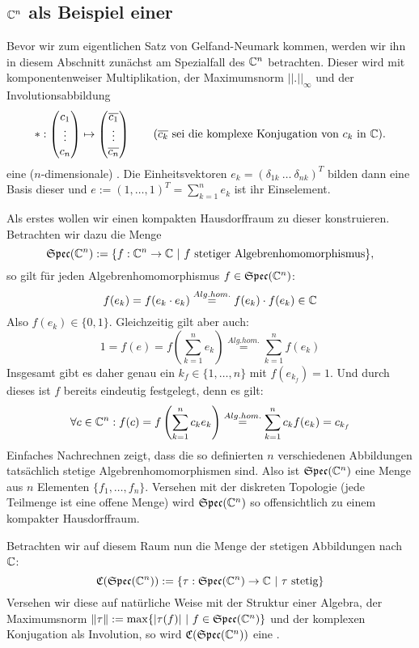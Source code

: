 \subsection{$\mathbb{C}^n$ als Beispiel einer \CAlg}\label{sec:BeispielCn}

Bevor wir zum eigentlichen Satz von Gelfand-Neumark kommen, werden wir ihn in diesem Abschnitt zunächst am Spezialfall des $\mathbb{C}^n$ betrachten. Dieser wird mit komponentenweiser Multiplikation, der Maximumsnorm $||.||_\infty$ und der Involutionsabbildung
\[*: 
\left(\begin{matrix}
 c_1 \\ \vdots \\ c_n 
\end{matrix}\right)
\mapsto 
\left(\begin{matrix}
\overline{c_1} \\ \vdots \\ \overline{c_n}
\end{matrix}\right) \qquad (\overline{c_k} \text{ sei die komplexe Konjugation von } c_k  \text{ in } \mathbb{C}).\]
eine ($n$-dimensionale) \CAlg{}. Die Einheitsvektoren $e_k = \left( \delta_{1k} \  \dots \ \delta_{nk} \right)^T$ bilden dann eine Basis dieser \CAlg{} und $e := (1,\dots,1)^T = \sum_{k=1}^ne_k$ ist ihr Einselement.

Als erstes wollen wir einen kompakten Hausdorffraum zu dieser \CAlg{} konstruieren. Betrachten wir dazu die Menge
	\[\mathfrak{Spec}(\mathbb{C}^n) := \{f: \mathbb{C}^n \to \mathbb{C} ~|~ f \text{ stetiger Algebrenhomomorphismus}\},\]
so gilt für jeden Algebrenhomomorphismus $f \in \mathfrak{Spec}(\mathbb{C}^n)$:
	\[f(e_k) = f(e_k \cdot e_k) \overset{Alg.hom.}{=} f(e_k) \cdot f(e_k) \in \mathbb{C}\]
Also $f(e_k) \in \{0, 1\}$. Gleichzeitig gilt aber auch:
	\[1 = f(e) = f\left(\sum_{k=1}^n e_k\right) \overset{Alg.hom.}{=} \sum_{k=1}^n f(e_k)\]
Insgesamt gibt es daher genau ein $k_f \in \{1, \dots, n\}$ mit $f(e_{k_f}) = 1$. Und durch dieses ist $f$ bereits eindeutig festgelegt, denn es gilt:
	\[\forall c \in \mathbb{C}^n: f(c) = f\left(\sum_{k=1}^n c_k e_k\right) \overset{Alg.hom.}{=} \sum_{k=1}^n c_k f(e_k) = c_{k_f} \]
Einfaches Nachrechnen zeigt, dass die so definierten $n$ verschiedenen Abbildungen tatsächlich stetige Algebrenhomomorphismen sind. Also ist $\mathfrak{Spec}(\mathbb{C}^n)$ eine Menge aus $n$ Elementen $\{f_1, \dots, f_n\}$. Versehen mit der diskreten Topologie (jede Teilmenge ist eine offene Menge) wird $\mathfrak{Spec}(\mathbb{C}^n)$ so offensichtlich zu einem kompakter Hausdorffraum.

Betrachten wir auf diesem Raum nun die Menge der stetigen Abbildungen nach $\mathbb{C}$:
	\[\mathfrak{C}(\mathfrak{Spec}(\mathbb{C}^n)) := \{\tau: \mathfrak{Spec}(\mathbb{C}^n) \to \mathbb{C} ~|~ \tau \text{ stetig}\}\]
Versehen wir diese auf natürliche Weise mit der Struktur einer Algebra, der Maximumsnorm $\left\lVert\tau\right\rVert := \max \{|\tau(f)| ~|~ f \in \mathfrak{Spec}(\mathbb{C}^n)\}$ und der komplexen Konjugation als Involution, so wird $\mathfrak{C}(\mathfrak{Spec}(\mathbb{C}^n))$ eine \CAlg. 

